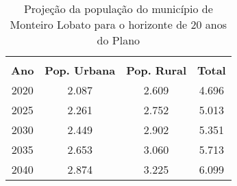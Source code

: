 \begin{table}[htbp]
  \centering
  \caption{Projeção da população do município de Monteiro Lobato para o horizonte de 20 anos do Plano}
	\begin{tabular}{c|c|c|c}
	\rowcolor[rgb]{ .969,  .588,  .275} \multicolumn{4}{c}{\textcolor[rgb]{ 1,  1,  1}{\textbf{Projeção populacional}}} \\
	\rowcolor[rgb]{ .984,  .831,  .706} \textbf{Ano} & \textbf{Pop. Urbana} & \textbf{Pop. Rural} & \textbf{Total} \\
	\rowcolor[rgb]{ .992,  .914,  .851} 2020  & 2.087  & 2.609  & 4.696 \\
	\rowcolor[rgb]{ .984,  .831,  .706} 2025  & 2.261  & 2.752  & 5.013 \\
	\rowcolor[rgb]{ .992,  .914,  .851} 2030  & 2.449  & 2.902  & 5.351 \\
	\rowcolor[rgb]{ .984,  .831,  .706} 2035  & 2.653  & 3.060  & 5.713 \\
	\rowcolor[rgb]{ .992,  .914,  .851} 2040  & 2.874  & 3.225  & 6.099 \\
\end{tabular}%
  \label{tab:proj_pop}%
\end{table}%

